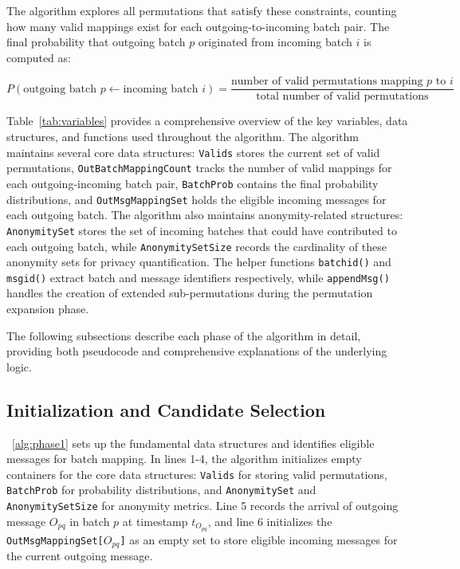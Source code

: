 \documentclass{article}
\begin{document}
The algorithm explores all permutations that satisfy 
these constraints, counting how many valid mappings exist for 
each outgoing-to-incoming batch pair. The final probability 
that outgoing batch $p$ originated from incoming batch $i$ is computed as:

$$P(\text{outgoing batch } p \leftarrow \text{incoming batch } i) = \frac{\text{number of valid permutations mapping } p \text{ to } i}{\text{total number of valid permutations}}$$


Table~\ref{tab:variables} provides a comprehensive 
overview of the key variables, data structures, 
and functions used throughout the algorithm. 
The algorithm maintains several core data 
structures: \texttt{Valids} stores the current 
set of valid permutations, \texttt{OutBatchMappingCount} 
tracks the number of valid mappings for each 
outgoing-incoming batch pair, \texttt{BatchProb} 
contains the final probability distributions, 
and \texttt{OutMsgMappingSet} holds the eligible 
incoming messages for each outgoing batch. The algorithm 
also maintains anonymity-related structures: 
\texttt{AnonymitySet} stores the set of incoming batches 
that could have contributed to each outgoing batch, 
while \texttt{AnonymitySetSize} records the cardinality 
of these anonymity sets for privacy quantification. 
The helper functions \texttt{batchid()} and \texttt{msgid()} 
extract batch and message identifiers respectively, 
while \texttt{appendMsg()} handles the creation of 
extended sub-permutations during the permutation 
expansion phase.

The following subsections describe each phase of the algorithm in detail, providing both pseudocode and comprehensive explanations of the underlying logic.



\subsection{Initialization and Candidate Selection}

~\ref{alg:phase1} sets up the fundamental data 
structures and identifies eligible messages for 
batch mapping. In lines 1-4, the algorithm 
initializes empty containers for the core data 
structures: \texttt{Valids} for storing valid 
permutations, \texttt{BatchProb} for probability 
distributions, and \texttt{AnonymitySet} 
and \texttt{AnonymitySetSize} for anonymity metrics. 
Line 5 records the arrival of outgoing 
message $O_{pq}$ in batch $p$ at timestamp $t_{O_{pq}}$, and line 6 
initializes the \texttt{OutMsgMappingSet[$O_{pq}$]}
as an empty set to store eligible incoming messages 
for the current outgoing message.
\end{document}
